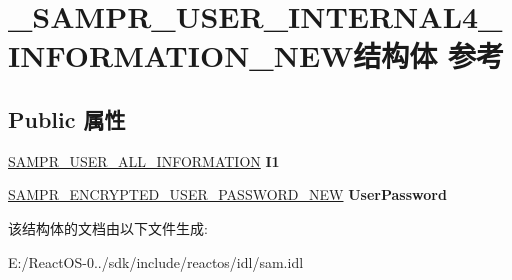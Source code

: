 \hypertarget{struct___s_a_m_p_r___u_s_e_r___i_n_t_e_r_n_a_l4___i_n_f_o_r_m_a_t_i_o_n___n_e_w}{}\section{\+\_\+\+S\+A\+M\+P\+R\+\_\+\+U\+S\+E\+R\+\_\+\+I\+N\+T\+E\+R\+N\+A\+L4\+\_\+\+I\+N\+F\+O\+R\+M\+A\+T\+I\+O\+N\+\_\+\+N\+E\+W结构体 参考}
\label{struct___s_a_m_p_r___u_s_e_r___i_n_t_e_r_n_a_l4___i_n_f_o_r_m_a_t_i_o_n___n_e_w}
\subsection*{Public 属性}
\begin{DoxyCompactItemize}
\item 
\mbox{\label{struct___s_a_m_p_r___u_s_e_r___i_n_t_e_r_n_a_l4___i_n_f_o_r_m_a_t_i_o_n___n_e_w_a6444c008c7e2d211c9110aa862c60d6a}} 
\hyperlink{struct___s_a_m_p_r___u_s_e_r___a_l_l___i_n_f_o_r_m_a_t_i_o_n}{S\+A\+M\+P\+R\+\_\+\+U\+S\+E\+R\+\_\+\+A\+L\+L\+\_\+\+I\+N\+F\+O\+R\+M\+A\+T\+I\+ON} {\bfseries I1}
\item 
\mbox{\label{struct___s_a_m_p_r___u_s_e_r___i_n_t_e_r_n_a_l4___i_n_f_o_r_m_a_t_i_o_n___n_e_w_a594ec65aec11565ba001f0659a40e21d}} 
\hyperlink{struct___s_a_m_p_r___e_n_c_r_y_p_t_e_d___u_s_e_r___p_a_s_s_w_o_r_d___n_e_w}{S\+A\+M\+P\+R\+\_\+\+E\+N\+C\+R\+Y\+P\+T\+E\+D\+\_\+\+U\+S\+E\+R\+\_\+\+P\+A\+S\+S\+W\+O\+R\+D\+\_\+\+N\+EW} {\bfseries User\+Password}
\end{DoxyCompactItemize}


该结构体的文档由以下文件生成\+:\begin{DoxyCompactItemize}
\item 
E\+:/\+React\+O\+S-\/0../sdk/include/reactos/idl/sam.\+idl\end{DoxyCompactItemize}
